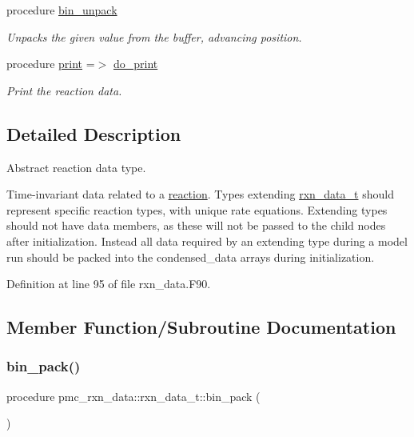 \begin{DoxyCompactItemize}
procedure \mbox{\hyperlink{structpmc__rxn__data_1_1rxn__data__t_ac30811244f805e4910ae3ecadac87f40}{bin\+\_\+unpack}}
\begin{DoxyCompactList}\small\item\em Unpacks the given value from the buffer, advancing position. \end{DoxyCompactList}\item 
procedure \mbox{\hyperlink{structpmc__rxn__data_1_1rxn__data__t_a6ad6dfa9cc1f6c3ccd60f9fe3f971ca3}{print}} =$>$ \mbox{\hyperlink{namespacepmc__rxn__data_ae01999e646da4760c3c3f4a9f7a48b59}{do\+\_\+print}}
\begin{DoxyCompactList}\small\item\em Print the reaction data. \end{DoxyCompactList}\end{DoxyCompactItemize}


\subsection{Detailed Description}
Abstract reaction data type. 

Time-\/invariant data related to a \mbox{\hyperlink{phlex_rxn}{reaction}}. Types extending {\ttfamily \mbox{\hyperlink{structpmc__rxn__data_1_1rxn__data__t}{rxn\+\_\+data\+\_\+t}}} should represent specific reaction types, with unique rate equations. Extending types should not have data members, as these will not be passed to the child nodes after initialization. Instead all data required by an extending type during a model run should be packed into the condensed\+\_\+data arrays during initialization. 

Definition at line 95 of file rxn\+\_\+data.\+F90.



\subsection{Member Function/\+Subroutine Documentation}
\mbox{\label{structpmc__rxn__data_1_1rxn__data__t_af896a5a86cfa32f47471d2d32b2cc486}} 
\subsubsection{\texorpdfstring{bin\+\_\+pack()}{bin\_pack()}}
{\footnotesize\ttfamily procedure pmc\+\_\+rxn\+\_\+data\+::rxn\+\_\+data\+\_\+t\+::bin\+\_\+pack (\begin{DoxyParamCaption}{ }\end{DoxyParamCaption})\hspace{0.3cm}{\ttfamily [private]}}




